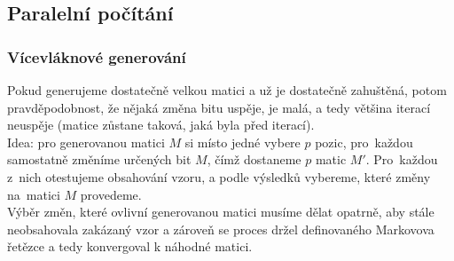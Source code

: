 \documentclass{beamer}
\begin{document}
\subsection{Paralelní počítání}
\begin{frame}
\frametitle{Vícevláknové generování}
Pokud generujeme dostatečně velkou matici a už je dostatečně zahuštěná, potom pravděpodobnost, že nějaká změna bitu uspěje, je malá, a tedy většina iterací neuspěje (matice zůstane taková, jaká byla před iterací).\\
\vspace{1em}
 Idea: pro generovanou matici $M$ si místo jedné vybere $p$ pozic, pro~každou samostatně změníme určených bit $M$, čímž dostaneme $p$ matic $M'$. Pro~každou z~nich otestujeme obsahování vzoru, a podle výsledků vybereme, které změny na~matici $M$ provedeme.\\
\vspace{1em}
 Výběr změn, které ovlivní generovanou matici musíme dělat opatrně, aby stále neobsahovala zakázaný vzor a zároveň se proces držel definovaného Markovova řetězce a tedy konvergoval k náhodné matici.
\end{frame}
\end{document}
